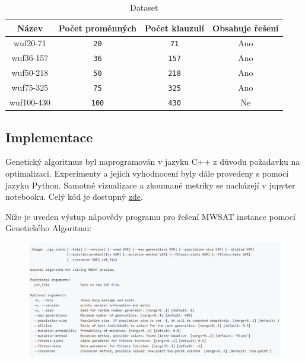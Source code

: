 \documentclass[12pt]{article}
\begin{document}
\begin{table}[h]
    \centering
    \begin{tabular}{|c|c|c|c|}
        \hline
        \textbf{Název} & \textbf{Počet proměnných} & \textbf{Počet klauzulí} & \textbf{Obsahuje řešení}\\
        \hline
        wuf20-71 & \texttt{20} & \texttt{71} & Ano \\
        wuf36-157 & \texttt{36} & \texttt{157} & Ano \\
        wuf50-218 & \texttt{50} & \texttt{218} & Ano \\
        wuf75-325 & \texttt{75} & \texttt{325} & Ano \\
        wuf100-430 & \texttt{100} & \texttt{430} & Ne \\
        \hline
    \end{tabular}
    \caption{Dataset}
    \label{tab:data}
\end{table}

\subsection{Implementace}

Genetický algoritmus byl naprogramován v jazyku C++ z důvodu požadavku na optimalizaci. Experimenty a jejich vyhodnocení byly dále provedeny s pomocí jazyku Python. Samotné vizualizace a zkoumané metriky se nacházejí v jupyter notebooku. Celý kód je dostupný \href{https://github.com/LukasTomas/MWSAT}{zde}.

\vspace{1em}
\noindent Níže je uveden výstup nápovědy programu pro řešení MWSAT instance pomocí Genetického Algoritmu:

\begin{figure}[H]
    \centering
    \begin{minipage}[b]{1\textwidth}
        \includegraphics[width=\textwidth]{images/ga_help.png}
        \label{fig:ga_help}
    \end{minipage}
\end{figure}
\end{document}

